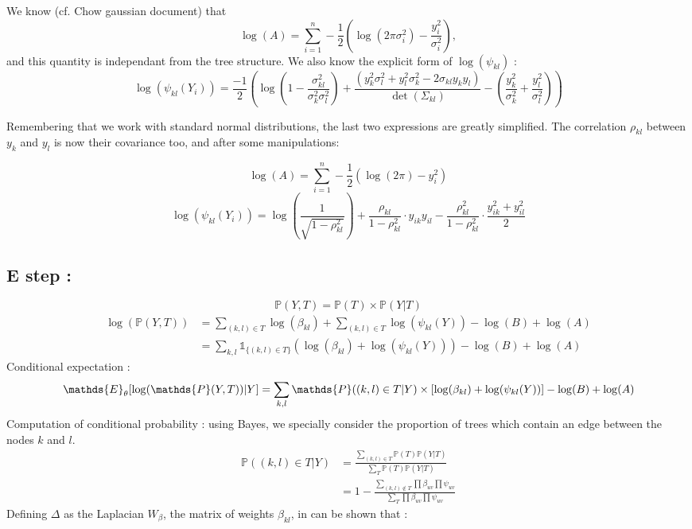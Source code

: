 \documentclass[a4paper,10pt]{article}
\begin{document}
We know (cf. Chow gaussian document) that 
\[\log(A) = \sum_{i=1}^n-\frac{1}{2}\left(\log(2\pi\sigma_i^2)-\frac{y_i^2}{\sigma_i^2}\right),\]
and this quantity is independant from the tree structure. We also know the explicit form of $\log(\psi_{kl})$ :
\[\log(\psi_{kl}(Y_i))=\frac{-1}{2}\left(\log\left(1-\frac{\sigma_{kl}^2}{\sigma_k^2 \sigma_{l}^2}\right)+\frac{(y_k^2\sigma_{l}^2+y_{l}^2\sigma_k^2-2\sigma_{kl}y_ky_{l})}
{\det(\Sigma_{kl})}-\left(\frac{y_k^2}{\sigma_k^2}+\frac{y_{l}^2}{\sigma_{l}^2}\right)\right)\]

Remembering that we work with standard normal distributions, the last two expressions are greatly simplified. The correlation $\rho_{kl}$ 
between $y_k$ and $y_l$ is now their covariance too, and after some manipulations:

\[\log(A) = \sum_{i=1}^n-\frac{1}{2}\left(\log(2\pi)-y_i^2\right)\]
\[\log(\psi_{kl}(Y_i))=\log\left(\frac{1}{\sqrt{1-\rho_{kl}^2}}\right)+\frac{\rho_{kl}}{1-\rho_{kl}^2}\cdot y_{ik}y_{il} - 
\frac{\rho_{kl}^2}{1-\rho_{kl}^2}\cdot \frac{y_{ik}^2 + y_{il}^2}{2}\]

\subsection{E step :}
\[ \mathds{P}(Y,T) = \mathds{P}(T)\times\mathds{P}(Y|T)\]
\begin{align*}
 \log(\mathds{P}(Y,T)) &= \sum_{(k,l)\in T} \log(\beta_{kl})  + \sum_{(k,l)\in T} \log(\psi_{kl}(Y))- \log (B)+\log(A)\\
 &=\sum_{k,l} \mathds{1}_{\{(k,l) \in T\}} \left(\log(\beta_{kl})  +  \log(\psi_{kl}(Y))\right)- \log (B)+\log(A)
\end{align*}
 Conditional expectation :
\[ \mathds{E}_\theta[\log(\mathds{P}(Y,T))|Y] \\
= \sum_{k,l}  \mathds{P}((k,l)\in T | Y) \times \left[ \log(\beta_{kl}) + \log(\psi_{kl}(Y)) \right]
 -\log(B)+\log(A)\]
 Computation of conditional probability : using Bayes, we specially consider the proportion of trees which contain an edge between the nodes $k$ and $l$.
 \begin{align*}
 \mathds{P}((k,l)\in T | Y)  &= \frac{\sum_{(k,l)\in T} \mathds{P}(T)\mathds{P}(Y|T)}{\sum_{T} \mathds{P}(T)\mathds{P}(Y|T)}\\
 &=1-\frac{\sum_{(k,l)\notin T} \prod \beta_{uv} \prod \psi_{uv}}{\sum_{T} \prod \beta_{uv} \prod \psi_{uv}}
 \end{align*}
 Defining $\Delta$ as the Laplacian $W_{\beta}$, the matrix  of weights $\beta_{kl}$, in can be shown that :
\end{document}
